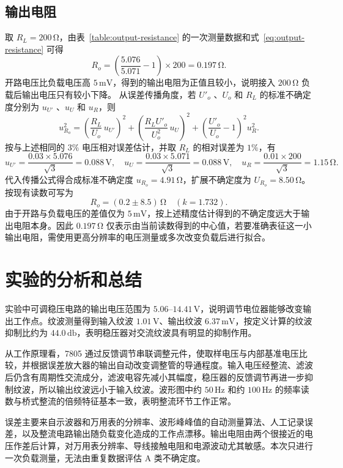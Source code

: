 \documentclass{../template/myrpt}
\begin{document}
\subsection{输出电阻}
取 $R_L=200\,\si{\ohm}$，由表~\ref{table:output-resistance} 的一次测量数据和式~\eqref{eq:output-resistance} 可得
\[
  R_o=\left(\frac{5.076}{5.071}-1\right)\times200
  =0.197\,\si{\ohm}.
\]
开路电压比负载电压高 $5\,\si{\milli\volt}$，得到的输出电阻为正值且较小，说明接入 $200\,\si{\ohm}$ 负载后输出电压只有较小下降。
从误差传播角度，若 $U'_o$ 、$U_o$ 和 $R_L$ 的标准不确定度分别为 $u_{U'}$ 、$u_U$ 和 $u_R$，则
\[
  u_{R_o}^2=\left(\frac{R_L}{U_o}\,u_{U'}\right)^2
  +\left(\frac{R_LU'_o}{U_o^2}\,u_U\right)^2
  +\left(\frac{U'_o}{U_o}-1\right)^2u_R^2.
\]
按与上述相同的 $3\%$ 电压相对误差估计，并取 $R_L$ 的相对误差为 $1\%$，有
\[
  u_{U'}=\frac{0.03\times5.076}{\sqrt{3}}=0.088\,\si{\volt},\quad
  u_U=\frac{0.03\times5.071}{\sqrt{3}}=0.088\,\si{\volt},\quad
  u_R=\frac{0.01\times200}{\sqrt{3}}=1.15\,\si{\ohm}.
\]
代入传播公式得合成标准不确定度 $u_{R_o}=4.91\,\si{\ohm}$，扩展不确定度为 $U_{R_o}=8.50\,\si{\ohm}$。按现有读数可写为
\[
  R_o=(0.2\pm8.5)\,\si{\ohm}\quad(k=1.732).
\]
由于开路与负载电压的差值仅为 $5\,\si{\milli\volt}$，按上述精度估计得到的不确定度远大于输出电阻本身。因此 $0.197\,\si{\ohm}$ 仅表示由当前读数得到的中心值，若要准确表征这一小输出电阻，需使用更高分辨率的电压测量或多次改变负载后进行拟合。

\section{实验的分析和总结}

实验中可调稳压电路的输出电压范围为 $5.06$--$14.41\,\si{\volt}$，说明调节电位器能够改变输出工作点。纹波测量得到输入纹波 $1.01\,\si{\volt}$、输出纹波 $6.37\,\si{\milli\volt}$，按定义计算的纹波抑制比约为 $44.0\,\si{\decibel}$，表明稳压器对交流纹波具有明显的抑制作用。

从工作原理看，7805 通过反馈调节串联调整元件，使取样电压与内部基准电压比较，并根据误差放大器的输出自动改变调整管的导通程度。输入电压经整流、滤波后仍含有周期性交流成分，滤波电容先减小其幅度，稳压器的反馈调节再进一步抑制纹波，所以输出纹波远小于输入纹波。波形图中约 $50\,\si{\hertz}$ 和约 $100\,\si{\hertz}$ 的频率读数与桥式整流的倍频特征基本一致，表明整流环节工作正常。

误差主要来自示波器和万用表的分辨率、波形峰峰值的自动测量算法、人工记录误差，以及整流电路输出随负载变化造成的工作点漂移。输出电阻由两个很接近的电压作差后计算，对万用表分辨率、导线接触电阻和电源波动尤其敏感。本次只进行一次负载测量，无法由重复数据评估 A 类不确定度。
\end{document}
